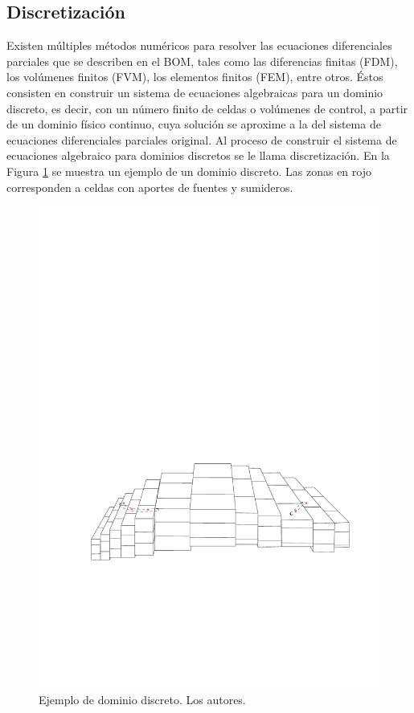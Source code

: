 \subsection{Discretización}\label{subsec:Discretization}

Existen múltiples métodos numéricos para resolver las ecuaciones diferenciales parciales que se describen en el BOM, tales como las diferencias finitas (FDM), los volúmenes finitos (FVM), los elementos finitos (FEM), entre otros. Éstos consisten en construir un sistema de ecuaciones algebraicas para un dominio discreto, es decir, con un número finito de celdas o volúmenes de control, a partir de un dominio físico continuo, cuya solución se aproxime a la del sistema de ecuaciones diferenciales parciales original. Al proceso de construir el sistema de ecuaciones algebraico para dominios discretos se le llama discretización. En la Figura \ref{fig:EmpanadaDiscretizada} se muestra un ejemplo de un dominio discreto. Las zonas en rojo corresponden a celdas con aportes de fuentes y sumideros.\\

\begin{figure}[h]
	\centering%
	\includegraphics[scale=0.8]{Fig/yacimiento-discretizacion.pdf}%
	\caption[Ejemplo de dominio discreto.]{Ejemplo de dominio discreto. Los autores.}
	\label{fig:EmpanadaDiscretizada}
\end{figure}

